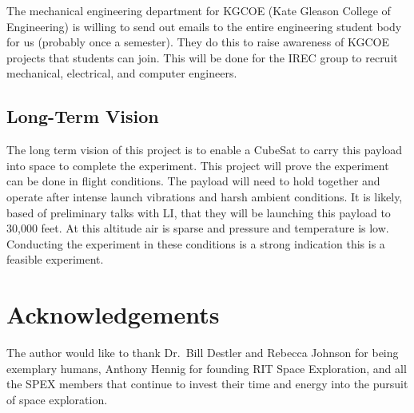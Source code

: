 \documentclass[conference]{IEEEtran} %
\begin{document}
The mechanical engineering department for KGCOE (Kate Gleason College of Engineering) is willing to send out emails to the entire engineering student body for us (probably once a semester). They 
do this to raise awareness of KGCOE projects that students can join. This will be done for the IREC group to recruit mechanical, electrical, and computer engineers. 

\subsection{Long-Term Vision}
\label{sec:vision}
The long term vision of this project is to enable a CubeSat to carry this payload into space to complete the experiment. This project will prove the experiment can be done in flight conditions. 
The payload will need to hold together and operate after intense launch vibrations and harsh ambient conditions. It is likely, based of preliminary talks with LI, that they will be launching this 
payload to 30,000 feet. At this altitude air is sparse and pressure and temperature is low. Conducting the experiment in these conditions is a strong indication this is a feasible experiment. 

\section*{Acknowledgements}
The author would like to thank Dr.~Bill Destler and Rebecca Johnson for being exemplary humans, Anthony Hennig for founding RIT Space Exploration, and all the SPEX members that continue to invest their time and energy into the pursuit of space exploration.

%
%

\end{document}
